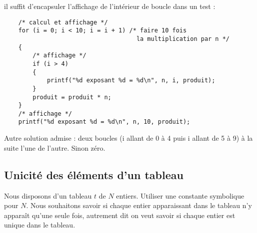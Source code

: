\begin{correction}
il suffit d'encapsuler l'affichage de l'intérieur de boucle dans un
test :
\begin{small}
\begin{verbatim}
    /* calcul et affichage */
    for (i = 0; i < 10; i = i + 1) /* faire 10 fois 
                                     la multiplication par n */
    {
        /* affichage */
        if (i > 4) 
        {
            printf("%d exposant %d = %d\n", n, i, produit);
        }
        produit = produit * n;
    }
    /* affichage */
    printf("%d exposant %d = %d\n", n, 10, produit);
\end{verbatim}
\end{small}
  \begin{baremeenv}
    Autre solution admise : deux boucles (i allant de 0 à 4 puis i
    allant de 5 à 9)  à la suite l'une de l'autre. Sinon zéro.
 \end{baremeenv}
\end{correction}

\subsection{Unicité des éléments d'un tableau}

Nous disposons d'un tableau $t$ de $N$ entiers. Utiliser une constante
symbolique pour $N$. Nous souhaitons
savoir si chaque entier apparaissant dans le tableau n'y apparaît
qu'une seule fois, autrement dit on veut savoir si chaque entier
est unique dans le tableau.

